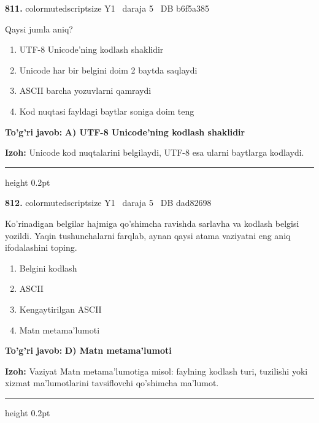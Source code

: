 \documentclass[10pt,a4paper,oneside]{article}
\begin{document}
\noindent\textbf{\color{ink}811.}  {color{muted}scriptsize Y1 \textbullet\ daraja 5 \textbullet\ DB b6f5a385}
\par
Qaysi jumla aniq?
\begin{enumerate}[label=\Alph*),leftmargin=9mm]
\item UTF-8 Unicode'ning kodlash shaklidir
\item Unicode har bir belgini doim 2 baytda saqlaydi
\item ASCII barcha yozuvlarni qamraydi
\item Kod nuqtasi fayldagi baytlar soniga doim teng
\end{enumerate}
\begin{tcolorbox}[enhanced,breakable,colback=teal!4,colframe=teal!50!black,boxrule=0.5pt,arc=1.1mm,left=3mm,right=3mm,top=1.7mm,bottom=1.7mm,before skip=2mm,after skip=2mm]
\textbf{\color{teal}To'g'ri javob:} \textbf{A) UTF-8 Unicode'ning kodlash shaklidir}
\par\smallskip
\textbf{Izoh:} Unicode kod nuqtalarini belgilaydi, UTF-8 esa ularni baytlarga kodlaydi.
\end{tcolorbox}
\vspace{2mm}\hrule height 0.2pt \vspace{3mm}

\noindent\textbf{\color{ink}812.}  {color{muted}scriptsize Y1 \textbullet\ daraja 5 \textbullet\ DB dad82698}
\par
Ko'rinadigan belgilar hajmiga qo'shimcha ravishda sarlavha va kodlash belgisi yozildi. Yaqin tushunchalarni farqlab, aynan qaysi atama vaziyatni eng aniq ifodalashini toping.
\begin{enumerate}[label=\Alph*),leftmargin=9mm]
\item Belgini kodlash
\item ASCII
\item Kengaytirilgan ASCII
\item Matn metama'lumoti
\end{enumerate}
\begin{tcolorbox}[enhanced,breakable,colback=teal!4,colframe=teal!50!black,boxrule=0.5pt,arc=1.1mm,left=3mm,right=3mm,top=1.7mm,bottom=1.7mm,before skip=2mm,after skip=2mm]
\textbf{\color{teal}To'g'ri javob:} \textbf{D) Matn metama'lumoti}
\par\smallskip
\textbf{Izoh:} Vaziyat Matn metama'lumotiga misol: faylning kodlash turi, tuzilishi yoki xizmat ma'lumotlarini tavsiflovchi qo'shimcha ma'lumot.
\end{tcolorbox}
\vspace{2mm}\hrule height 0.2pt \vspace{3mm}
\end{document}
